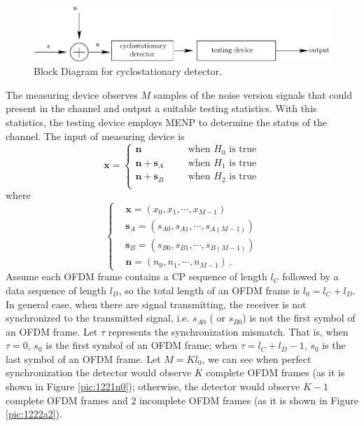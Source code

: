 \begin{figure}[!t]
  \centering 
  \includegraphics[width=\textwidth]{4/fig1.eps}
  \caption{Block Diagram for  cyclostationary detector.}
  \label{pic:1222a0}
\end{figure}
The measuring device observes $M$ samples of the noise version signals that could present in the channel and output a suitable testing statistics. With this statistics, the testing device employs MENP to determine the status of the channel. The input of measuring device is
\begin{equation}
  \mathbf{x} = \begin{cases}
	\mathbf{n}\;\;\;\;\;\;&\text{when $H_0$ is true}\\
	\mathbf{n}+\mathbf{s}_A\;\;\;\;\;\;&\text{when $H_1$ is true}\\
	\mathbf{n}+\mathbf{s}_B\;\;\;\;\;\;&\text{when $H_2$ is true}\\
  \end{cases}
  \label{equ:1209a1}
\end{equation}
where 
\begin{equation}
  \begin{cases}
	&\mathbf{x} = (x_0, x_1, \cdots, x_{M-1})\\
	&\mathbf{s}_A = (s_{A0}, s_{A1}, \cdots, s_{A(M-1)})\\
	&\mathbf{s}_B = (s_{B0}, s_{B1}, \cdots, s_{B(M-1)})\\
	&\mathbf{n} = (n_{0}, n_{1}, \cdots, n_{M-1})\,.
  \end{cases}
  \label{xssn}
\end{equation}
Assume each OFDM frame contains a CP sequence of length $l_C$ followed by a data sequence of length $l_D$, so the total length of an OFDM frame is $l_0 = l_C+l_D$. In general case, when there are signal transmitting, the receiver is not synchronized to the transmitted signal, i.e. $s_{A0}$ ( or $s_{B0}$) is not the first symbol of an OFDM frame. Let $\tau$ represents the synchronization mismatch. That is, when $\tau = 0$, $s_0$ is the first symbol of an OFDM frame; when $\tau = l_C+l_D -1$, $s_0$ is the last symbol of an OFDM frame. Let $M = Kl_0$, we can see when perfect synchronization the detector would observe $K$ complete  OFDM frames (as it is shown in Figure \ref{pic:1221n0}); otherwise, the detector would observe $K-1$ complete OFDM frames and $2$ incomplete OFDM frames (as it is shown in Figure \ref{pic:1222a2}). 
